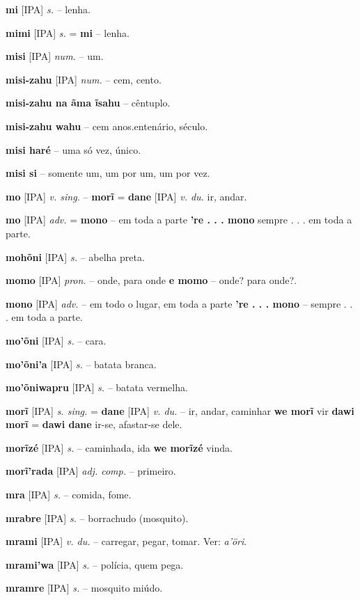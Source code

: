 \textbf{mi} [IPA] \textit{s.} -- lenha.

\textbf{mimi} [IPA] \textit{s.} = \textbf{mi} -- lenha.

\textbf{misi} [IPA] \textit{num.} -- um.

\textbf{misi-zahu} [IPA] \textit{num.} -- cem, cento.

\textbf{misi-zahu na ãma ĩsahu} -- cêntuplo.

\textbf{misi-zahu wahu} -- cem anos.entenário, século.

\textbf{misi haré} -- uma só vez, único.

\textbf{misi si} -- somente um, um por um, um por vez.

\textbf{mo} [IPA] \textit{v. sing.} -- \textbf{morĩ} = \textbf{dane} [IPA] \textit{v. du.} ir, andar.

\textbf{mo} [IPA] \textit{adv.} = \textbf{mono} -- em toda a parte  \textbf{'re . . . mono} sempre . . . em toda a parte.

\textbf{mohõni} [IPA] \textit{s.} -- abelha preta.

\textbf{momo} [IPA] \textit{pron.} -- onde, para onde  \textbf{e momo} -- onde? para onde?.

\textbf{mono} [IPA] \textit{adv.} -- em todo o lugar, em toda a parte  \textbf{'re . . . mono} -- sempre . . . em toda a parte.

\textbf{mo'õni} [IPA] \textit{s.} -- cara.

\textbf{mo'õni'a} [IPA] \textit{s.} -- batata branca.

\textbf{mo'õniwapru} [IPA] \textit{s.} -- batata vermelha.

\textbf{morĩ} [IPA] \textit{s. sing.} = \textbf{dane} [IPA] \textit{v. du.} -- ir, andar, caminhar  \textbf{we morĩ} vir  \textbf{dawi morĩ} = \textbf{dawi dane} ir-se, afastar-se dele.

\textbf{morĩzé} [IPA] \textit{s.} -- caminhada, ida  \textbf{we morĩzé} vinda.

\textbf{morĩ'rada} [IPA] \textit{adj. comp.} -- primeiro.

\textbf{mra} [IPA] \textit{s.} -- comida, fome.

\textbf{mrabre} [IPA] \textit{s.} -- borrachudo (mosquito).

\textbf{mrami} [IPA] \textit{v. du.} -- carregar, pegar, tomar. Ver: \textit{a'öri}.

\textbf{mrami'wa} [IPA] \textit{s.} -- polícia, quem pega.

\textbf{mramre} [IPA] \textit{s.} -- mosquito miúdo.

